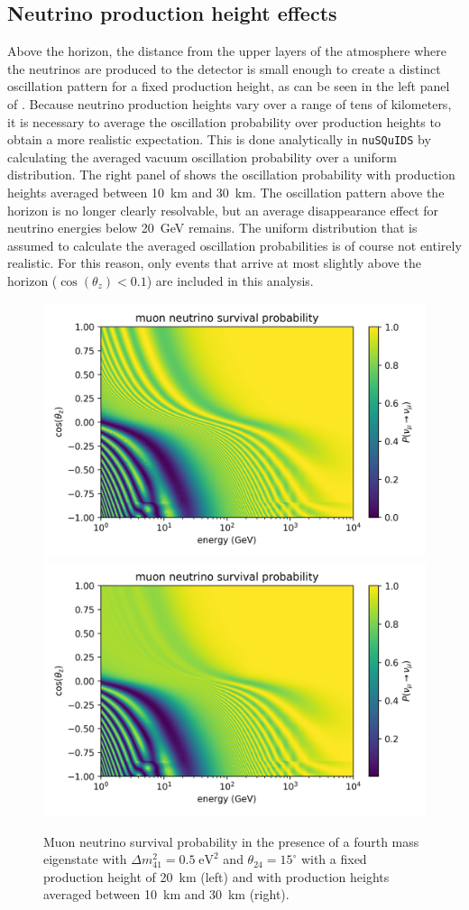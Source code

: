 \subsection{Neutrino production height effects}
Above the horizon, the distance from the upper layers of the atmosphere where the neutrinos are produced to the detector is small enough to create a distinct oscillation pattern for a fixed production height, as can be seen in the left panel of . Because neutrino production heights vary over a range of tens of kilometers, it is necessary to average the oscillation probability over production heights to obtain a more realistic expectation. This is done analytically in \texttt{nuSQuIDS} by calculating the averaged vacuum oscillation probability over a uniform distribution. The right panel of  shows the oscillation probability with production heights averaged between 10~km and 30~km. The oscillation pattern above the horizon is no longer clearly resolvable, but an average disappearance effect for neutrino energies below 20~GeV remains. The uniform distribution that is assumed to calculate the averaged oscillation probabilities is of course not entirely realistic. For this reason, only events that arrive at most slightly above the horizon ($\cos(\theta_z)<0.1$) are included in this analysis.
\begin{figure}
    \centering
    \includegraphics[width=0.45\linewidth]{figures/measurement/sterile_analysis/physics/dm41_0.5eV2_th24_15deg_no_filter.png}
    \includegraphics[width=0.45\linewidth]{figures/measurement/sterile_analysis/physics/dm41_0.5eV2_th24_15deg_avg_height_10-30km.png}
    \caption{Muon neutrino survival probability in the presence of a fourth mass eigenstate with $\Delta m^2_{41}=0.5\;\mathrm{eV^2}$ and $\theta_{24}=15^\circ$ with a fixed production height of 20~km (left) and with production heights averaged between 10~km and 30~km (right).}
    \label{fig:numu_survival_0.5eV2_full_range}
\end{figure}

